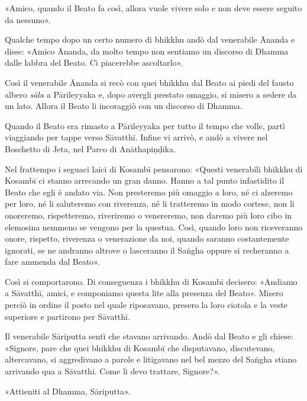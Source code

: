 «Amico, quando il Beato fa così, allora vuole vivere solo e non deve essere
seguito da nessuno».

Qualche tempo dopo un certo numero di bhikkhu andò dal venerabile Ānanda e
disse: «Amico Ānanda, da molto tempo non sentiamo un discorso di Dhamma dalle
labbra del Beato. Ci piacerebbe ascoltarlo».

Così il venerabile Ānanda si recò con quei bhikkhu dal Beato ai piedi del fausto
albero \emph{sāla} a Pārileyyaka e, dopo avergli prestato omaggio, si misero a
sedere da un lato. Allora il Beato li incoraggiò con un discorso di Dhamma.


 Quando il Beato era rimasto a Pārileyyaka per tutto il
tempo che volle, partì viaggiando per tappe verso Sāvatthī. Infine vi arrivò, e
andò a vivere nel Boschetto di Jeta, nel Parco di Anāthapiṇḍika.

Nel frattempo i seguaci laici di Kosambī pensarono: «Questi venerabili bhikkhu
di Kosambī ci stanno arrecando un gran danno. Hanno a tal punto infastidito il
Beato che egli è andato via. Non presteremo più omaggio a loro, né ci alzeremo
per loro, né li saluteremo con riverenza, né li tratteremo in modo cortese, non
li onoreremo, rispetteremo, riveriremo o venereremo, non daremo più loro cibo in
elemosina nemmeno se vengono per la questua. Così, quando loro non riceveranno
onore, rispetto, riverenza o venerazione da noi, quando saranno costantemente
ignorati, se ne andranno altrove o lasceranno il Saṅgha oppure si recheranno a
fare ammenda dal Beato».

Così si comportarono. Di conseguenza i bhikkhu di Kosambī decisero: «Andiamo a
Sāvatthī, amici, e componiamo questa lite alla presenza del Beato». Misero
perciò in ordine il posto nel quale riposavano, presero la loro ciotola e la
veste superiore e partirono per Sāvatthī.

Il venerabile Sāriputta sentì che stavano arrivando. Andò dal Beato e gli
chiese: «Signore, pare che quei bhikkhu di Kosambī che disputavano, discutevano,
altercavano, si aggredivano a parole e litigavano nel bel mezzo del Saṅgha
stiano arrivando qua a Sāvatthī. Come li devo trattare, Signore?».

«Attieniti al Dhamma, Sāriputta».

